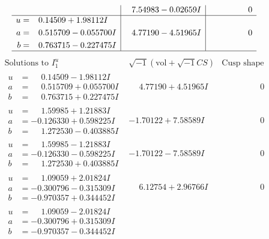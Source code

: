 \documentclass[1p]{elsarticle_modified}
\theoremstyle{definition}
\newcommand{\I}{\sqrt{-1}}
\begin{document}
$$\begin{array}{c|c|c}
 & \phantom{-}7.54983 - 0.02659 I & \phantom{-0.000000 } 0 \\ \hline\begin{aligned}
u &= \phantom{-}0.14509 + 1.98112 I \\
a &= \phantom{-}0.515709 - 0.055700 I \\
b &= \phantom{-}0.763715 - 0.227475 I\end{aligned}
 & \phantom{-}4.77190 - 4.51965 I & \phantom{-0.000000 } 0\\
 \hline 
 \end{array}$$\newpage$$\begin{array}{c|c|c}  
\text{Solutions to }I^u_{1}& \I (\text{vol} + \sqrt{-1}CS) & \text{Cusp shape}\\
 \hline 
\begin{aligned}
u &= \phantom{-}0.14509 - 1.98112 I \\
a &= \phantom{-}0.515709 + 0.055700 I \\
b &= \phantom{-}0.763715 + 0.227475 I\end{aligned}
 & \phantom{-}4.77190 + 4.51965 I & \phantom{-0.000000 } 0 \\ \hline\begin{aligned}
u &= \phantom{-}1.59985 + 1.21883 I \\
a &= -0.126330 + 0.598225 I \\
b &= \phantom{-}1.272530 - 0.403885 I\end{aligned}
 & -1.70122 + 7.58589 I & \phantom{-0.000000 } 0 \\ \hline\begin{aligned}
u &= \phantom{-}1.59985 - 1.21883 I \\
a &= -0.126330 - 0.598225 I \\
b &= \phantom{-}1.272530 + 0.403885 I\end{aligned}
 & -1.70122 - 7.58589 I & \phantom{-0.000000 } 0 \\ \hline\begin{aligned}
u &= \phantom{-}1.09059 + 2.01824 I \\
a &= -0.300796 - 0.315309 I \\
b &= -0.970357 + 0.344452 I\end{aligned}
 & \phantom{-}6.12754 + 2.96766 I & \phantom{-0.000000 } 0 \\ \hline\begin{aligned}
u &= \phantom{-}1.09059 - 2.01824 I \\
a &= -0.300796 + 0.315309 I \\
b &= -0.970357 - 0.344452 I\end{aligned}

\end{array}$$
\end{document}
